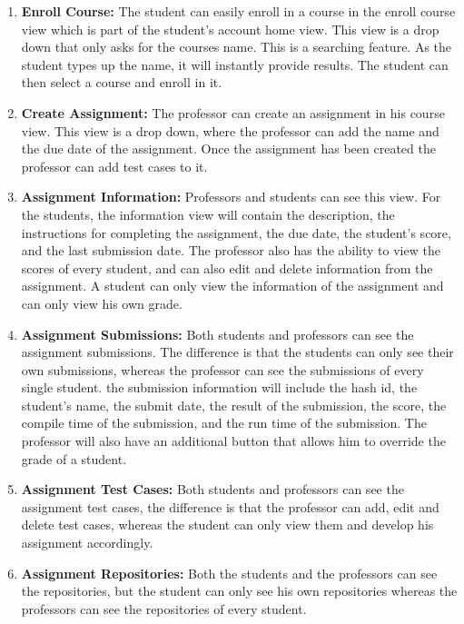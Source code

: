 \begin{enumerate}
\item \textbf{Enroll Course:} The student can easily enroll in a course in the
enroll course view which is part of the student's account home view. This view
is a drop down that only asks for the courses name. This is a searching feature.
As the student types up the name, it will instantly provide results. The student
can then select a course and enroll in it.

\item \textbf{Create Assignment:} The professor can create an assignment in his
course view. This view is a drop down, where the professor can add the name and
the due date of the assignment. Once the assignment has been created the
professor can add test cases to it.

\item \textbf{Assignment Information:} Professors and students can see this
view. For the students, the information view will contain the description, the
instructions for completing the assignment, the due date, the student's score,
and the last submission date. The professor also has the ability to view the
scores of every student, and can also edit and delete information from the
assignment. A student can only view the information of the assignment and can
only view his own grade.

\item \textbf{Assignment Submissions:} Both students and professors can see the
assignment submissions. The difference is that the students can only see their
own submissions, whereas the professor can see the submissions of every single
student. the submission information will include the hash id, the student's
name, the submit date, the result of the submission, the score, the compile time
of the submission, and the run time of the submission. The professor will also
have an additional button that allows him to override the grade of a student.

\item \textbf{Assignment Test Cases:} Both students and professors can see the
assignment test cases, the difference is that the professor can add, edit and
delete test cases, whereas the student can only view them and develop his
assignment accordingly.

\item \textbf{Assignment Repositories:} Both the students and the professors can
see the repositories, but the student can only see his own repositories whereas
the professors can see the repositories of every student.


\end{enumerate}
